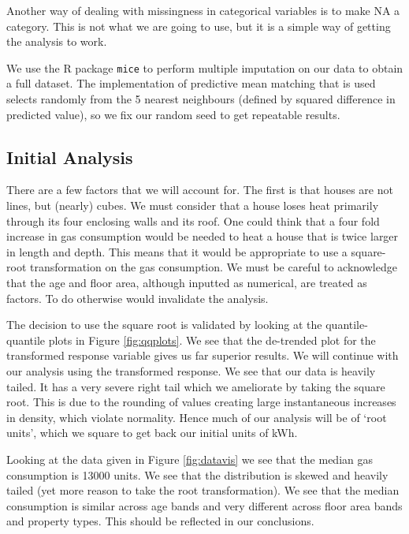 \documentclass[8pt]{extarticle}
\begin{document}
Another way of dealing with missingness in categorical variables is to make NA a category. This is not what we are going to use, but it is a simple way of getting the analysis to work.

We use the R package \texttt{mice} to perform multiple imputation on our data to obtain a full dataset. The implementation of predictive mean matching that is used selects randomly from the 5 nearest neighbours (defined by squared difference in predicted value), so we fix our random seed to get repeatable results.

\subsection{Initial Analysis}

There are a few factors that we will account for. The first is that houses are not lines, but (nearly) cubes. We must consider that a house loses heat primarily through its four enclosing walls and its roof. One could think that a four fold increase in gas consumption would be needed to heat a house that is twice larger in length and depth. This means that it would be appropriate to use a square-root transformation on the gas consumption. We must be careful to acknowledge that the age and floor area, although inputted as numerical, are treated as factors. To do otherwise would invalidate the analysis.

The decision to use the square root is validated by looking at the quantile-quantile plots in Figure \ref{fig:qqplots}. We see that the de-trended plot for the transformed response variable gives us far superior results. We will continue with our analysis using the transformed response. We see that our data is heavily tailed. It has a very severe right tail which we ameliorate by taking the square root. This is due to the rounding of values creating large instantaneous increases in density, which violate normality. Hence much of our analysis will be of `root units', which we square to get back our initial units of kWh.

Looking at the data given in Figure \ref{fig:datavis} we see that the median gas consumption is 13000 units. We see that the distribution is skewed and heavily tailed (yet more reason to take the root transformation). We see that the median consumption is similar across age bands and very different across floor area bands and property types. This should be reflected in our conclusions. 
\end{document}
